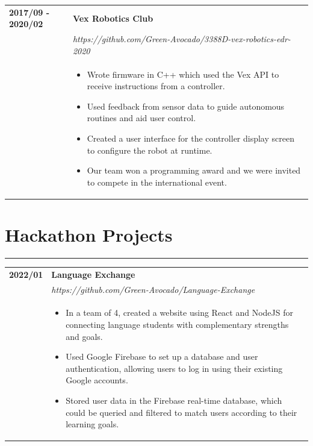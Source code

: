 \documentclass[letterpaper]{article}
\newcommand{\sect}[1]{\section*{#1}
                        {\color{cyan}
                        \rule{\textwidth}{1pt}
                        \vspace{-1ex}}}
\begin{document}
        \begin{tabular}{p{} p{}}
            \textbf{2017/09 - 2020/02} & \textbf{Vex Robotics Club} \\
            & \emph{https://github.com/Green-Avocado/3388D-vex-robotics-edr-2020} \\
            & \begin{itemize}
                \item Wrote firmware in C++ which used the Vex API to receive instructions from a
                    controller.
                \item Used feedback from sensor data to guide autonomous routines and aid user control.
                \item Created a user interface for the controller display screen to configure the robot at
                    runtime.
                \item Our team won a programming award and we were invited to compete in the international
                    event.
            \end{itemize}
        \end{tabular}

    \sect{Hackathon Projects}

        \begin{tabular}{p{} p{}}
            \textbf{2022/01} & \textbf{Language Exchange} \\
            & \emph{https://github.com/Green-Avocado/Language-Exchange} \\
            & \begin{itemize}
                \item In a team of 4, created a website using React and NodeJS for connecting language
                    students with complementary strengths and goals.
                \item Used Google Firebase to set up a database and user authentication, allowing users to
                    log in using their existing Google accounts.
                \item Stored user data in the Firebase real-time database, which could be queried and
                    filtered to match users according to their learning goals.
            \end{itemize}
            \\
        \end{tabular}
\end{document}
